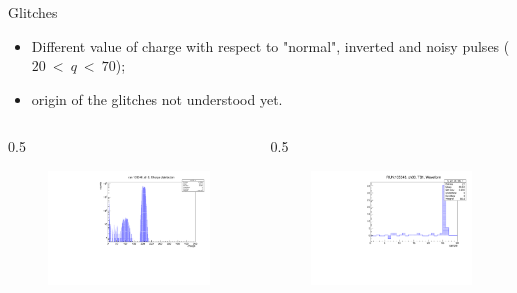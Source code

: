 \documentclass{beamer}[10pt]
\begin{document}
\begin{frame}{Glitches}
\begin{itemize}
\item Different value of charge with respect to "normal", inverted and noisy pulses ($20 \ < \ q \ < \ 70$);
\item origin of the glitches not understood yet.
\end{itemize}
\begin{columns}
\begin{column}{0.5 \framewidth}
\begin{figure}[H]
   \centering
   \includegraphics[width= .90\columnwidth]{figures/pdf/glitches.pdf}
   \label{fig:wffytl}
 \end{figure}
\end{column}
\begin{column}{0.5\framewidth}
\begin{figure}[H]
   \centering
   \includegraphics[width= .90\columnwidth]{figures/pdf/glitcheswf.pdf}
   \label{fig:wffytl}
 \end{figure}
\end{column}
\end{columns}
\end{frame}
\end{document}

